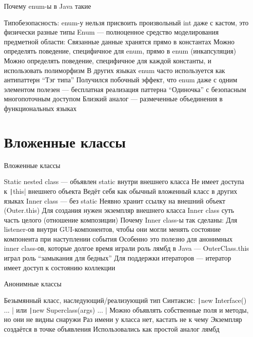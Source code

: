 \documentclass{../../slides-style}
\begin{document}
    \begin{frame}{Почему enum-ы в Java такие}
        \begin{outline}
            \1 Типобезопасность: enum-у нельзя присвоить произвольный int даже с кастом, это физически разные типы
            \1 Enum --- полноценное средство моделирования предметной области:
                \2 Связанные данные хранятся прямо в константах
                \2 Можно определять поведение, специфичное для enum, прямо в enum (инкапсуляция)
                \2 Можно определять поведение, специфичное для каждой константы, и использовать полиморфизм
                    \3 В других языках enum часто используется как антипаттерн \enquote{Тэг типа}
            \1 Получился побочный эффект, что enum даже с одним элементом полезен --- бесплатная реализация паттерна \enquote{Одиночка} с безопасным многопоточным доступом
            \1 Близкий аналог --- размеченные объединения в функциональных языках
        \end{outline}
    \end{frame}

    \section{Вложенные классы}

    \begin{frame}{Вложенные классы}
        \begin{outline}
            \1 Static nested class --- объявлен static внутри внешнего класса
                \2 Не имеет доступа к \texttt|this| внешнего объекта
                \2 Ведёт себя как обычный вложенный класс в других языках
            \1 Inner class --- без static
                \2 Неявно хранит ссылку на внешний объект (Outer.this)
                \2 Для создания нужен экземпляр внешнего класса
                \2 Inner class суть часть целого (отношение композиции)
            \1 Почему Inner class-ы так сделаны:
                \2 Для listener-ов внутри GUI-компонентов, чтобы они могли менять состояние компонента при наступлении события
                    \3 Особенно это полезно для анонимных inner class-ов, которые долгое время играли роль лямбд в Java --- OuterClass.this играл роль \enquote{замыкания для бедных}
                \2 Для поддержки итераторов --- итератор имеет доступ к состоянию коллекции
        \end{outline}
    \end{frame}

    \begin{frame}{Анонимные классы}
        \begin{outline}
            \1 Безымянный класс, наследующий/реализующий тип
            \1 Синтаксис: \texttt|new Interface() { ... }| или \texttt|new Superclass(args) { ... }|
            \1 Можно объявлять собственные поля и методы, но они не видны снаружи
                \2 Раз имени у класса нет, кастать не к чему
            \1 Экземпляр создаётся в точке объявления
            \1 Использовались как простой аналог лямбд
        \end{outline}
    \end{frame}
\end{document}
